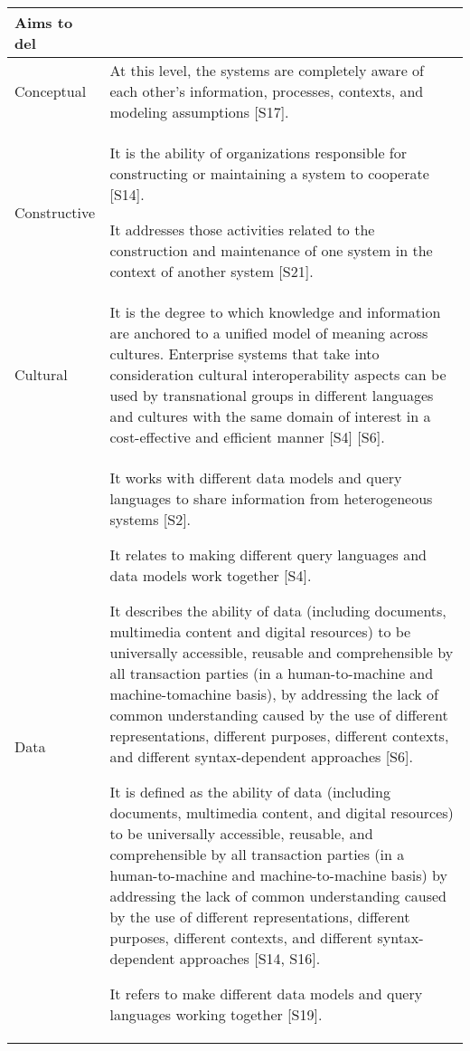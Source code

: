 \begin{longtable}{|p{2.3cm}|p{14cm}|}
    

    Aims to del
\\\hline    
    Conceptual
    &
     At this level, the systems are completely aware of each other's information, processes, contexts, and modeling assumptions [S17].
\\\hline
    Constructive 
    & 
    It is the ability of organizations responsible for constructing or maintaining a system to cooperate [S14].
    
    It addresses those activities related to the construction and maintenance of one system in the context of another system [S21].
\\\hline
    Cultural &  
    It is the degree to which knowledge and information are anchored to a unified model of meaning across cultures. Enterprise systems that take into consideration cultural interoperability aspects can be used by transnational groups in different languages and cultures with the same domain of interest in a cost-effective and efficient manner [S4] [S6].
\\\hline
     Data
     &
     It works with different data models and query languages to share information from heterogeneous systems [S2].
     
     It relates to making different query languages and data models work together [S4].
     
     It describes the ability of data (including documents, multimedia content and digital resources) to be universally accessible, reusable and comprehensible by all transaction parties (in a human-to-machine and machine-tomachine basis), by addressing the lack of common understanding caused by the use of different representations, different purposes, different contexts, and different syntax-dependent approaches [S6].
     
     It is defined as the ability of data (including documents, multimedia content, and digital resources) to be universally accessible, reusable, and comprehensible by all transaction parties (in a human-to-machine and machine-to-machine basis) by addressing the lack of common understanding caused by the use of different representations, different purposes, different contexts, and different syntax-dependent approaches [S14, S16].
     
     
     It refers to make different data models and query languages working together [S19].
     

\end{longtable}
